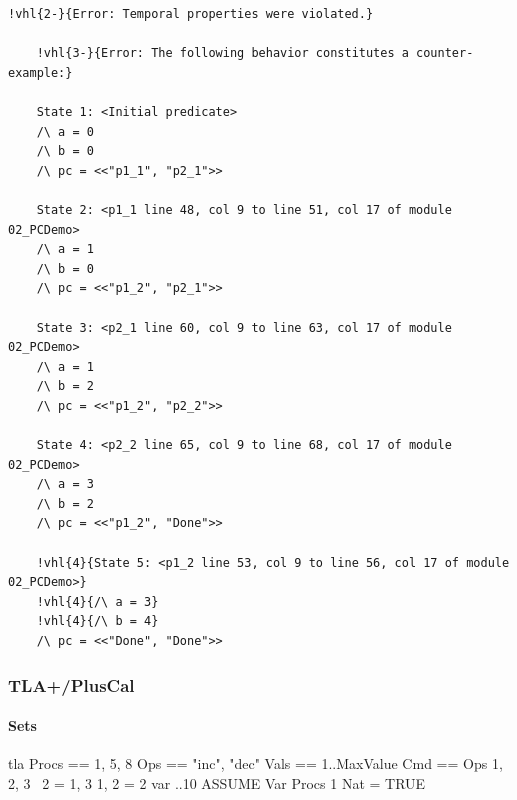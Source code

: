 \documentclass[
  11pt,aspectratio=169,pdf,hyperref={unicode,colorlinks=false}
]{beamer}
\begin{document}
\newcommand{\vhl}[2]{\alt<#1>{\bf\ttfamily\textcolor{red!90!black}{#2}}{#2}}
\begin{frame}[c,fragile]
  \begin{tcolorbox}[colback=shellbgcolor,boxrule=.25pt]%
  \centering\tiny%
  \begin{Verbatim}[commandchars=!\{\}]
    !vhl{2-}{Error: Temporal properties were violated.}

    !vhl{3-}{Error: The following behavior constitutes a counter-example:}

    State 1: <Initial predicate>
    /\ a = 0
    /\ b = 0
    /\ pc = <<"p1_1", "p2_1">>

    State 2: <p1_1 line 48, col 9 to line 51, col 17 of module 02_PCDemo>
    /\ a = 1
    /\ b = 0
    /\ pc = <<"p1_2", "p2_1">>

    State 3: <p2_1 line 60, col 9 to line 63, col 17 of module 02_PCDemo>
    /\ a = 1
    /\ b = 2
    /\ pc = <<"p1_2", "p2_2">>

    State 4: <p2_2 line 65, col 9 to line 68, col 17 of module 02_PCDemo>
    /\ a = 3
    /\ b = 2
    /\ pc = <<"p1_2", "Done">>

    !vhl{4}{State 5: <p1_2 line 53, col 9 to line 56, col 17 of module 02_PCDemo>}
    !vhl{4}{/\ a = 3}
    !vhl{4}{/\ b = 4}
    /\ pc = <<"Done", "Done">>
  \end{Verbatim}
\end{tcolorbox}
\end{frame}

\begin{frame}[c]
  \centering{}%
\end{frame}

\begin{frame}[t,fragile]
  \frametitle{TLA+/PlusCal}
  \framesubtitle{Sets}
  \begin{code}{tla}
    Procs == {1, 5, 8}
    Ops == {"inc", "dec"}
    Vals == 1..MaxValue
    Cmd == Ops 
    {1, 2, 3} \ {2} = {1, 3}
    {1, 2}  = {2}
    var ..10
    ASSUME Var \notin Procs
    1 \in Nat = TRUE
  \end{code}
\end{frame}
\end{document}

